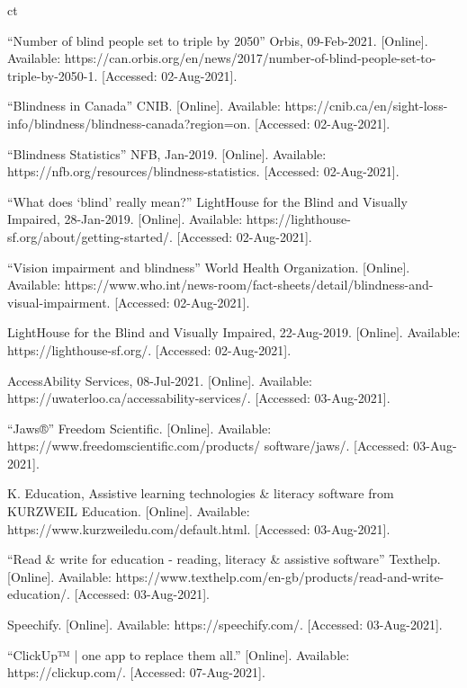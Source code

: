ct\documentclass[a4paper,11pt]{article}
\begin{document}
\newpage
\begin{thebibliography}{9}
“Number of blind people set to triple by 2050” Orbis, 09-Feb-2021. [Online]. Available: https://can.orbis.org/en/news/2017/number-of-blind-people-set-to-triple-by-2050-1. [Accessed: 02-Aug-2021]. 

“Blindness in Canada” CNIB. [Online]. Available: https://cnib.ca/en/sight-loss-info/blindness/blindness-canada?region=on. [Accessed: 02-Aug-2021]. 

“Blindness Statistics” NFB, Jan-2019. [Online]. Available: https://nfb.org/resources/blindness-statistics. [Accessed: 02-Aug-2021]. 

“What does ‘blind’ really mean?” LightHouse for the Blind and Visually Impaired, 28-Jan-2019. [Online]. Available: https://lighthouse-sf.org/about/getting-started/. [Accessed: 02-Aug-2021]. 

“Vision impairment and blindness” World Health Organization. [Online]. Available: https://www.who.int/news-room/fact-sheets/detail/blindness-and-visual-impairment. [Accessed: 02-Aug-2021]. 

LightHouse for the Blind and Visually Impaired, 22-Aug-2019. [Online]. Available: https://lighthouse-sf.org/. [Accessed: 02-Aug-2021].

AccessAbility Services, 08-Jul-2021. [Online]. Available: https://uwaterloo.ca/accessability-services/. [Accessed: 03-Aug-2021]. 

“Jaws®” Freedom Scientific. [Online]. Available: https://www.freedomscientific.com/products/
software/jaws/. [Accessed: 03-Aug-2021].

K. Education, Assistive learning technologies \& literacy software from KURZWEIL Education. [Online]. Available: https://www.kurzweiledu.com/default.html. [Accessed: 03-Aug-2021]. 

“Read \& write for education - reading, literacy \& assistive software” Texthelp. [Online]. Available: https://www.texthelp.com/en-gb/products/read-and-write-education/. [Accessed: 03-Aug-2021]. 

Speechify. [Online]. Available: https://speechify.com/. [Accessed: 03-Aug-2021]. 

“ClickUp™ | one app to replace them all.” [Online]. Available: https://clickup.com/. [Accessed: 07-Aug-2021]. 


\end{thebibliography}
\end{document}
